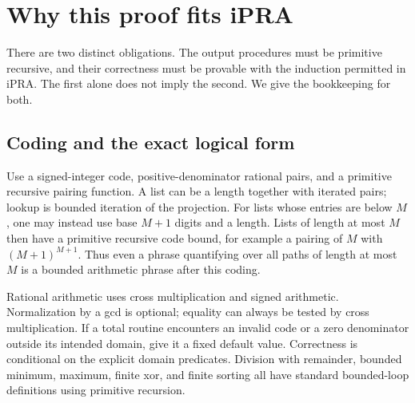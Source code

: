 \section{Why this proof fits iPRA}\label{sec:arithmetic}

There are two distinct obligations. The output procedures must be
primitive recursive, and their correctness must be provable with the
induction permitted in iPRA. The first alone does not imply the
second. We give the bookkeeping for both.

\subsection{Coding and the exact logical form}

Use a signed-integer code, positive-denominator rational pairs,
and a primitive recursive pairing function. A list can be a length
together with iterated pairs; lookup is bounded iteration of the
projection. For lists whose entries are below $M$, one may instead
use base $M+1$ digits and a length. Lists of length at most $M$
then have a primitive recursive code bound, for example a pairing
of $M$ with $(M+1)^{M+1}$. Thus even a phrase quantifying over
all paths of length at most $M$ is a bounded arithmetic phrase
after this coding.

Rational arithmetic uses cross multiplication and signed arithmetic.
Normalization by a gcd is optional; equality can always be tested by
cross multiplication. If a total routine encounters an invalid code
or a zero denominator outside its intended domain, give it a fixed
default value. Correctness is conditional on the explicit domain
predicates. Division with remainder, bounded minimum, maximum,
finite xor, and finite sorting all have standard bounded-loop
definitions using primitive recursion.

